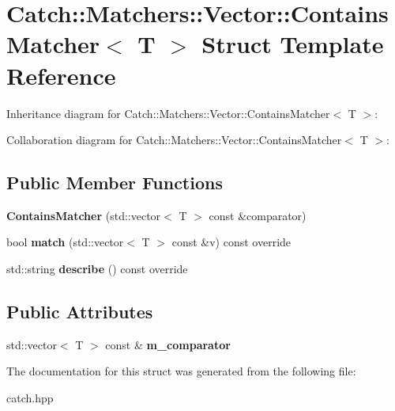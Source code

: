 \hypertarget{structCatch_1_1Matchers_1_1Vector_1_1ContainsMatcher}{}\section{Catch\+:\+:Matchers\+:\+:Vector\+:\+:Contains\+Matcher$<$ T $>$ Struct Template Reference}
\label{structCatch_1_1Matchers_1_1Vector_1_1ContainsMatcher}


Inheritance diagram for Catch\+:\+:Matchers\+:\+:Vector\+:\+:Contains\+Matcher$<$ T $>$\+:


Collaboration diagram for Catch\+:\+:Matchers\+:\+:Vector\+:\+:Contains\+Matcher$<$ T $>$\+:
\subsection*{Public Member Functions}
\begin{DoxyCompactItemize}
\item 
{\bfseries Contains\+Matcher} (std\+::vector$<$ T $>$ const \&comparator)\hypertarget{structCatch_1_1Matchers_1_1Vector_1_1ContainsMatcher_ad8e92c8399be6dce75bb5702cdfab700}{}\label{structCatch_1_1Matchers_1_1Vector_1_1ContainsMatcher_ad8e92c8399be6dce75bb5702cdfab700}

\item 
bool {\bfseries match} (std\+::vector$<$ T $>$ const \&v) const override\hypertarget{structCatch_1_1Matchers_1_1Vector_1_1ContainsMatcher_afd33467ae48a41a634572b41b053f67f}{}\label{structCatch_1_1Matchers_1_1Vector_1_1ContainsMatcher_afd33467ae48a41a634572b41b053f67f}

\item 
std\+::string {\bfseries describe} () const override\hypertarget{structCatch_1_1Matchers_1_1Vector_1_1ContainsMatcher_abe6a9ea3d6506c9a1f75ff524f35832e}{}\label{structCatch_1_1Matchers_1_1Vector_1_1ContainsMatcher_abe6a9ea3d6506c9a1f75ff524f35832e}

\end{DoxyCompactItemize}
\subsection*{Public Attributes}
\begin{DoxyCompactItemize}
\item 
std\+::vector$<$ T $>$ const \& {\bfseries m\+\_\+comparator}\hypertarget{structCatch_1_1Matchers_1_1Vector_1_1ContainsMatcher_a83d051166e4ed0d535219ad6ee99abb2}{}\label{structCatch_1_1Matchers_1_1Vector_1_1ContainsMatcher_a83d051166e4ed0d535219ad6ee99abb2}

\end{DoxyCompactItemize}


The documentation for this struct was generated from the following file\+:\begin{DoxyCompactItemize}
\item 
catch.\+hpp\end{DoxyCompactItemize}
